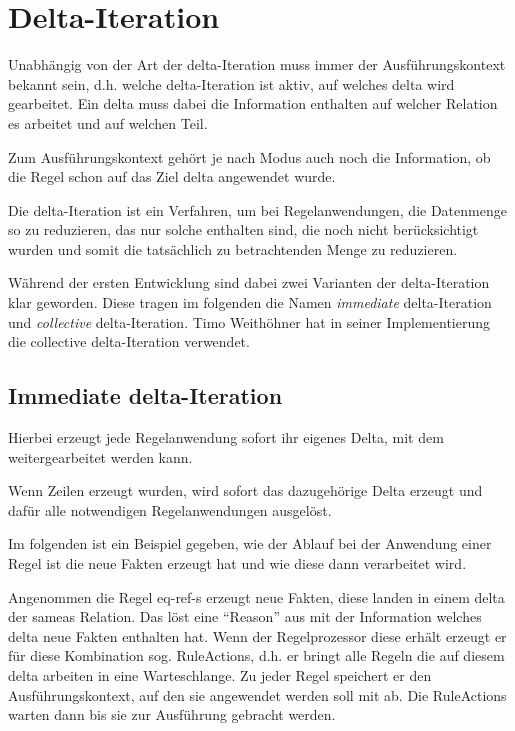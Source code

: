 \section{Delta-Iteration}
\label{abschnitt-delta-iteration}

Unabhängig von der Art der delta-Iteration muss immer der Ausführungskontext bekannt sein, d.h. welche delta-Iteration ist aktiv, auf welches delta wird gearbeitet. Ein delta muss dabei die Information enthalten auf welcher Relation es arbeitet und auf welchen Teil.

Zum Ausführungskontext gehört je nach Modus auch noch die Information, ob die Regel schon auf das Ziel delta angewendet wurde.

Die delta-Iteration ist ein Verfahren, um bei Regelanwendungen, die Datenmenge so zu reduzieren, das nur solche enthalten sind, die noch nicht berücksichtigt wurden und somit die tatsächlich zu betrachtenden Menge zu reduzieren.

Während der ersten Entwicklung sind dabei zwei Varianten der delta-Iteration klar geworden. Diese tragen im folgenden die Namen \emph{immediate} delta-Iteration und \emph{collective} delta-Iteration. Timo Weithöhner hat in seiner Implementierung die collective delta-Iteration verwendet.

\subsection{Immediate delta-Iteration}

Hierbei erzeugt jede Regelanwendung sofort ihr eigenes Delta, mit dem weitergearbeitet werden kann.

Wenn Zeilen erzeugt wurden, wird sofort das dazugehörige Delta erzeugt und dafür alle notwendigen Regelanwendungen ausgelöst.

Im folgenden ist ein Beispiel gegeben, wie der Ablauf bei der Anwendung einer Regel ist die neue Fakten erzeugt hat und wie diese dann verarbeitet wird.

Angenommen die Regel eq-ref-s erzeugt neue Fakten, diese landen in einem delta der sameas Relation. Das löst eine ``Reason'' aus mit der Information welches delta neue Fakten enthalten hat. Wenn der Regelprozessor diese erhält erzeugt er für diese Kombination sog. RuleActions, d.h. er bringt alle Regeln die auf diesem delta arbeiten in eine Warteschlange. Zu jeder Regel speichert er den Ausführungskontext, auf den sie angewendet werden soll mit ab. Die RuleActions warten dann bis sie zur Ausführung gebracht werden.

